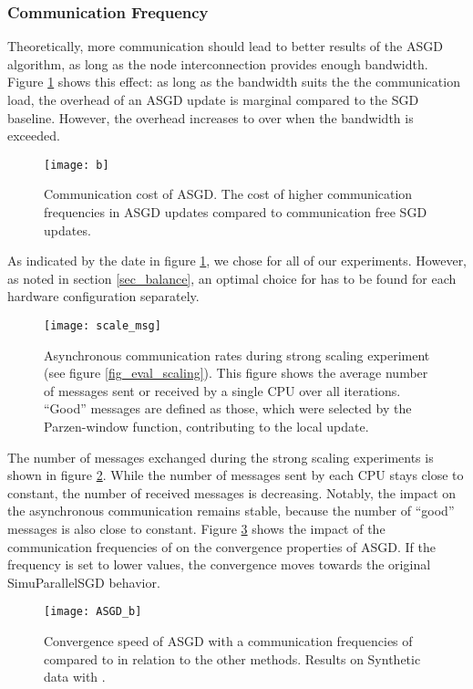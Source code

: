 \documentclass{acm_proc_article-sp}
\begin{document}
\subsubsection*{Communication Frequency\label{sec_ex_com}}
Theoretically, more communication should lead to better results of the ASGD 
algorithm, as long as the node interconnection provides enough bandwidth.
Figure \ref{fig_eval_b} shows this effect: as long as the bandwidth suits the
the communication load, the overhead of an ASGD update is marginal compared to 
the SGD baseline. However, the overhead increases to over 
when the bandwidth is exceeded.         
\begin{figure}[ht]
\texttt{[image: b]}
\caption{Communication cost of ASGD. The cost of higher communication 
frequencies  in ASGD updates compared to communication free SGD updates. 
\label{fig_eval_b}}
\end{figure}

As indicated by the date in figure \ref{fig_eval_b}, we chose  for all of our 
experiments. However, as noted in section \ref{sec_balance}, an optimal choice 
for  has to be found for each hardware configuration separately.
\begin{figure}[!ht]
\texttt{[image: scale\_msg]}
\caption{Asynchronous communication rates during strong scaling experiment (see
figure \ref{fig_eval_scaling}). This figure shows the average number of messages sent or
received by a single CPU over all iterations. ``Good'' messages are defined as
those, which were selected by the Parzen-window function, contributing to the
local update.
\label{fig_msg}}
\end{figure}
The number of messages exchanged during the strong scaling experiments is shown 
in figure \ref{fig_msg}. While the number of messages sent by each CPU stays 
close to constant, the number of received messages is decreasing. Notably, 
the impact on the asynchronous communication remains stable, because the number of
``good'' messages is also close to constant.    
Figure \ref{fig_eval_comim} shows the impact of the communication frequencies of  on the
convergence properties of ASGD. If the frequency is set to lower values, the convergence 
moves towards the original SimuParallelSGD behavior.
\begin{figure}[!ht]
\texttt{[image: ASGD\_b]}
\caption{Convergence speed of ASGD with a communication frequencies of  
compared to  in relation to the other methods. Results on Synthetic 
data with .\label{fig_eval_comim}}
\end{figure}
\end{document}
